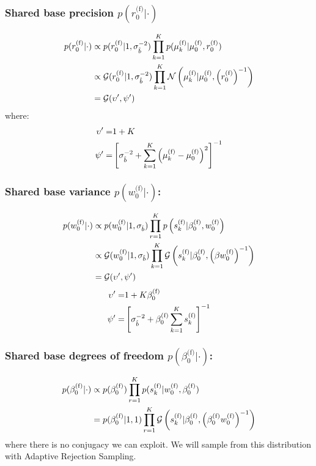 \documentclass[smallextended]{svjour3}          %
\newcommand\alberto[1]{\textcolor{black}{#1}}
\newcommand{\muo}{\mu_{0}^\text{(f)}}
\newcommand{\ro}{r_{0}^\text{(f)}}
\newcommand{\invro}{\left(r_{0}^\text{(f)}\right)^{-1}}
\newcommand{\wo}{w_{0}^\text{(f)}}
\newcommand{\betaof}{\beta_{0}^\text{(f)}}
\newcommand{\muk}{\mu_{k}^\text{(f)}}
\newcommand{\sk}{s_{k}^\text{(f)}}
\begin{document}
\subsubsection*{Shared base precision $p(\ro | \cdot)$}
\begin{align*}
p(\ro | \cdot) 
&\propto 
p(\ro | 1, \sigma_{\hat{b}}^{-2}) 
\prod_{k = 1}^K p(\muk | \muo, \ro) \\
&\propto
\mathcal{G}(\ro | \alberto{1, \sigma_{\hat{b}}^{-2}}) 
\prod_{k = 1}^K \mathcal{N}\left(\muk | \muo,  \invro\right) \\
&= \mathcal{G}(\upsilon', \psi')
\end{align*}
where:
\begin{align*}
\upsilon' =& \alberto{1}+K\\
\psi' =& \left[\alberto{\sigma_{\hat{b}}^{-2}} + \sum_{k=1}^K \left(\muk- \muo\right)^2\right]^{-1}
\end{align*}

\subsubsection*{Shared base variance $p(\wo | \cdot)$:}
\begin{align*}
p(\wo | \cdot) 
&\propto 
p(\wo | \alberto{1, \sigma_{\hat{b}}})
\prod_{r=1}^K p\left(\sk | \betaof, \alberto{\wo}\right)\\
&\propto
\mathcal{G}(\wo | \alberto{1, \sigma_{\hat{b}}}) 
\prod_{k=1}^K \mathcal{G}\left(\sk | \betaof, \alberto{\left(\beta\wo\right)^{-1}}\right)\\
&= \mathcal{G}(\upsilon', \psi')   
\end{align*}
\begin{align*}
\upsilon' =& \alberto{1} + K\betaof\\
\psi' =& 
\left[\alberto{\sigma_{\hat{b}}^{-2}} +  \betaof \sum_{k=1}^K \sk\right]^{-1}
\end{align*}

\subsubsection*{Shared base degrees of freedom $p(\betaof | \cdot)$:}
\begin{align*}
p(\betaof | \cdot) 
&\propto
p(\betaof) \prod_{r=1}^K p(\sk | \wo ,  \betaof)\\
&=p(\betaof | 1, \alberto{1})\prod_{r=1}^K  \mathcal{G} \left(\sk |\betaof, \alberto{\left(\betaof  \wo \right)^{-1}}\right)
\end{align*}
where there is no conjugacy we can exploit. We will sample from this distribution with Adaptive Rejection Sampling.
\end{document}
